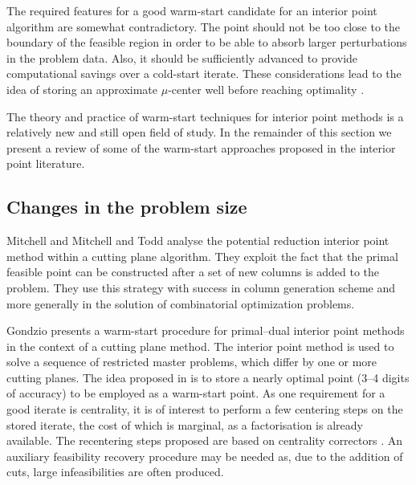 The required features for a good warm-start candidate for an
interior point algorithm are somewhat contradictory.
The point should not be too close to the boundary of the feasible 
region in order to be able to absorb larger perturbations in the 
problem data. 
Also, it should be sufficiently advanced to provide 
computational savings over a cold-start iterate.
These considerations lead to the idea of storing an approximate
$\mu$-center well before reaching optimality 
\cite{Gondzio98,GondzioGrothey03,GondzioVial,YildirimWright}.

The theory and practice of warm-start techniques for interior point 
methods is a relatively new and still open field of study.
In the remainder of this section we present a review of some 
of the warm-start approaches proposed in the interior point literature.

%
%
\subsection{Changes in the problem size}

Mitchell \cite{phd:Mitchell} and Mitchell and Todd \cite{MitchellTodd}
analyse the potential reduction interior point method within
a cutting plane algorithm. They exploit the fact that
the primal feasible point can be constructed after a set of new
columns is added to the problem. They use this strategy with success
in column generation scheme and more generally in the solution 
of combinatorial optimization problems.

Gondzio \cite{Gondzio98} presents a warm-start procedure for 
primal--dual interior point methods in the context of a cutting 
plane method. The interior 
point method is used to solve a sequence of restricted master 
problems, which differ by one or more cutting planes.
%
%
The idea proposed in \cite{Gondzio98} is to store a nearly optimal 
point (3--4 digits of accuracy) to be employed as a warm-start point.
%
%
As one requirement for a good iterate is centrality, it is of interest 
to perform a few centering steps on the stored iterate, the cost of 
which is marginal, as a factorisation is already available. The 
recentering steps proposed are based on
centrality correctors \cite{Gondzio96}.
An auxiliary feasibility recovery procedure may be needed as, due to 
the addition of cuts, large infeasibilities are often produced.

